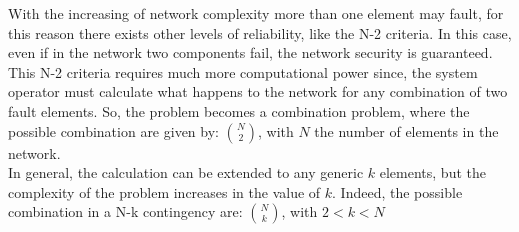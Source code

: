 With the increasing of network complexity more than one element may fault, for this reason there exists other levels of reliability, like the N-2 criteria. In this case, even if in the network two components fail, the network security is guaranteed. \\
This N-2 criteria requires much more computational power since, the system operator must calculate what happens to the network for any combination of two fault elements. So, the problem becomes a combination problem, where the possible combination are given by: $N \choose 2$, with $N$ the number of elements in the network. \\

In general, the calculation can be extended to any generic $k$ elements, but the complexity of the problem increases in the value of $k$. Indeed, the possible combination in a N-k contingency are: $N \choose k$, with $2 < k < N$




